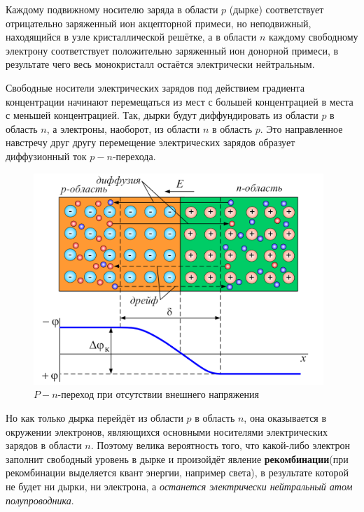 	\par Каждому подвижному носителю заряда в области \(p\) (дырке) соответствует отрицательно заряженный ион акцепторной примеси, но неподвижный, находящийся в узле кристаллической решётке, а в области \(n\) каждому свободному электрону соответствует положительно заряженный ион донорной примеси, в результате чего весь монокристалл остаётся электрически нейтральным.
	
	\par Свободные носители электрических зарядов под действием градиента концентрации начинают перемещаться из мест с большей концентрацией в места с меньшей концентрацией. Так, дырки будут диффундировать из области \(p\) в область \(n\), а электроны, наоборот, из области \(n\) в область \(p\). Это направленное навстречу друг другу перемещение электрических зарядов образует диффузионный ток \(p-n\)-перехода.
	
	\begin{figure}[h]
		\centering
		\includegraphics[height=8cm]{img/13} 
		\captionsetup{font=footnotesize}
		\caption{\(P-n\)-переход при отсутствии внешнего напряжения} 
	\end{figure} 
	
	\par Но как только дырка перейдёт из области \(p\) в область \(n\), она оказывается в окружении электронов, являющихся основными носителями электрических зарядов в области \(n\). Поэтому велика вероятность того, что какой-либо электрон заполнит свободный уровень в дырке и произойдёт явление \textbf{рекомбинации}(при рекомбинации выделяется квант энергии, например света), в результате которой не будет ни дырки, ни электрона, а \textit{останется электрически нейтральный атом полупроводника}. 
	
